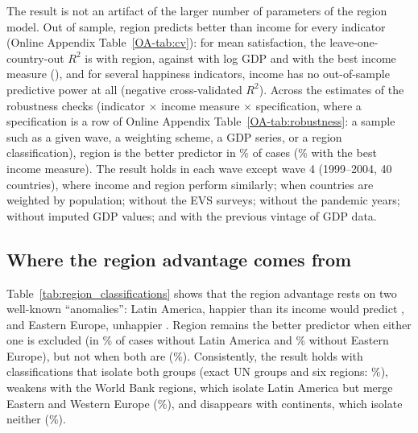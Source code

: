 \documentclass[12pt]{article}
\begin{document}
The result is not an artifact of the larger number of parameters of the region model. Out of sample, region predicts better than income for every indicator (Online Appendix Table~\ref{OA-tab:cv}): for mean satisfaction, the leave-one-country-out $R^2$ is \cvRegionSatisfiedMean with region, against \cvIncomeSatisfiedMean with log GDP and \cvIncomeBestSatisfiedMean with the best income measure (\bestIncome), and for several happiness indicators, income has no out-of-sample predictive power at all (negative cross-validated $R^2$). Across the \nSpecsWVS estimates of the robustness checks (indicator $\times$ income measure $\times$ specification, where a specification is a row of Online Appendix Table~\ref{OA-tab:robustness}: a sample such as a given wave, a weighting scheme, a GDP series, or a region classification), region is the better predictor in \shareRegionBetterWVS\% of cases (\shareRegionBetterWVSbest\% with the best income measure). The result holds in each wave except wave 4 (1999--2004, 40 countries), where income and region perform similarly; when countries are weighted by population; without the EVS surveys; without the pandemic years; without imputed GDP values; and with the previous vintage of GDP data.

\subsection{Where the region advantage comes from}\label{subsec:region_limits}

Table~\ref{tab:region_classifications} shows that the region advantage rests on two well-known ``anomalies'': Latin America, happier than its income would predict \citep{graham_paradox_2009,rojas_handbook_2016}, and Eastern Europe, unhappier \citep{guriev_unhappiness_2009}. Region remains the better predictor when either one is excluded (in \shareRegionBetterNoLatam\% of cases without Latin America and \shareRegionBetterNoEE\% without Eastern Europe), but not when both are (\shareRegionBetterNoLatamEE\%). Consistently, the result holds with classifications that isolate both groups (exact UN groups and six regions: \shareRegionBetterUN\%), weakens with the World Bank regions, which isolate Latin America but merge Eastern and Western Europe (\shareRegionBetterWB\%), and disappears with continents, which isolate neither (\shareRegionBetterContinents\%). %
\end{document}
